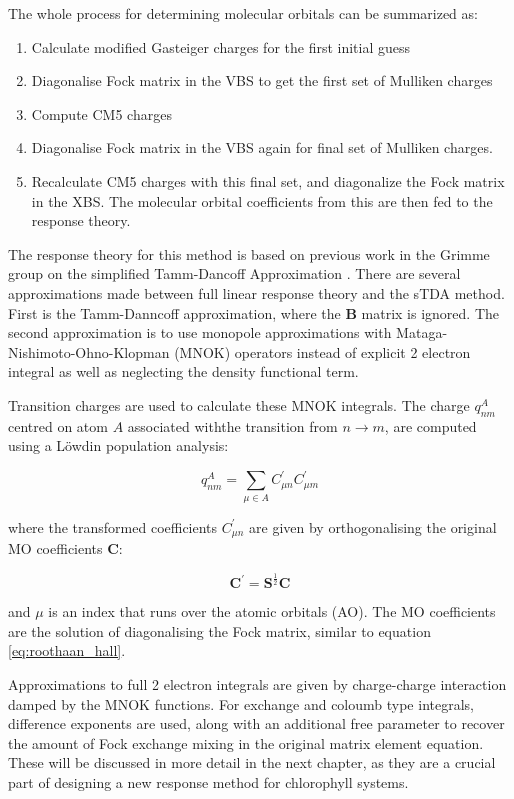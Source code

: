The whole process for determining molecular orbitals can be summarized as:
\begin{enumerate}
	\item Calculate modified Gasteiger charges for the first initial guess
	\item Diagonalise Fock matrix in the VBS to get the first set of Mulliken charges
	\item Compute CM5 charges
	\item Diagonalise Fock matrix in the VBS again for final set of Mulliken charges.
	\item Recalculate CM5 charges with this final set, and diagonalize the Fock matrix in the XBS. The molecular orbital coefficients from this are then fed to the response theory.
\end{enumerate}

The response theory for this method is based on previous work in the Grimme 
group on the simplified Tamm-Dancoff Approximation \cite{Grimme2013}.
There are several approximations made between full linear response theory and
the sTDA method. First is the Tamm-Danncoff approximation, where the $\mathbf{B}$
matrix is ignored. The second approximation is to use monopole approximations with
Mataga-Nishimoto-Ohno-Klopman (MNOK) operators instead of explicit 2 electron integral
as well as neglecting the density functional term.

Transition charges are used to calculate these MNOK integrals. The charge $q^A_{nm}$
centred on atom $A$ associated withthe transition from $ n \rightarrow m$, are
computed using a Löwdin population analysis:

\begin{equation}
q_{nm}^A = \sum_{\mu \in A} C^\prime_{\mu n} C^\prime_{\mu m}
\end{equation}

where the transformed coefficients $C^\prime_{\mu n}$ are given by orthogonalising
the original MO coefficients $\textbf{C}$:

\begin{equation}
\textbf{C}^\prime = \textbf{S}^{\frac{1}{2}} \textbf{C}
\end{equation}

and $\mu$ is an index that runs over the atomic orbitals (AO). The MO coefficients
are the solution of diagonalising the Fock matrix, similar to equation \ref{eq:roothaan_hall}.

Approximations to full 2 electron integrals are given by charge-charge interaction
damped by the MNOK\cite{Nishimoto1957}\cite{Ohno1964}\cite{Klopman1964} functions.
For exchange and coloumb type integrals, difference exponents are used, along with
an additional free parameter to recover the amount of Fock exchange mixing in
the original matrix element equation. These will be discussed in more detail in
the next chapter, as they are a crucial part of designing a new response method 
for chlorophyll systems.

